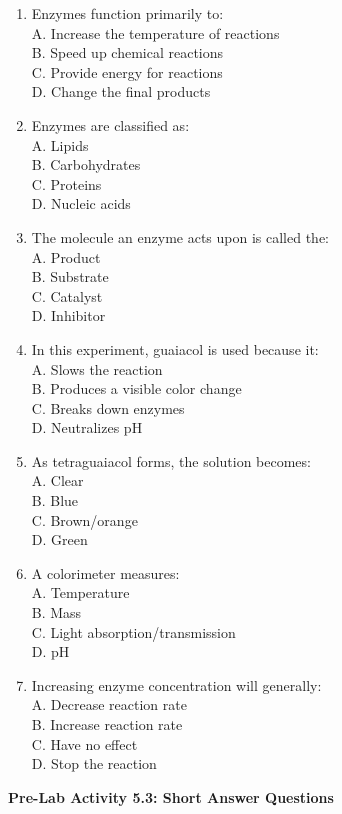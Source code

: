 \documentclass[
  letterpaper,
  DIV=11,
  numbers=noendperiod]{scrreprt}
\begin{document}
\begin{enumerate}
\def\labelenumi{\arabic{enumi}.}
\item
  Enzymes function primarily to:\\
  A. Increase the temperature of reactions\\
  B. Speed up chemical reactions\\
  C. Provide energy for reactions\\
  D. Change the final products
\item
  Enzymes are classified as:\\
  A. Lipids\\
  B. Carbohydrates\\
  C. Proteins\\
  D. Nucleic acids
\item
  The molecule an enzyme acts upon is called the:\\
  A. Product\\
  B. Substrate\\
  C. Catalyst\\
  D. Inhibitor
\item
  In this experiment, guaiacol is used because it:\\
  A. Slows the reaction\\
  B. Produces a visible color change\\
  C. Breaks down enzymes\\
  D. Neutralizes pH
\item
  As tetraguaiacol forms, the solution becomes:\\
  A. Clear\\
  B. Blue\\
  C. Brown/orange\\
  D. Green
\item
  A colorimeter measures:\\
  A. Temperature\\
  B. Mass\\
  C. Light absorption/transmission\\
  D. pH
\item
  Increasing enzyme concentration will generally:\\
  A. Decrease reaction rate\\
  B. Increase reaction rate\\
  C. Have no effect\\
  D. Stop the reaction
\end{enumerate}

\textbf{Pre-Lab Activity 5.3: Short Answer Questions}
\end{document}
